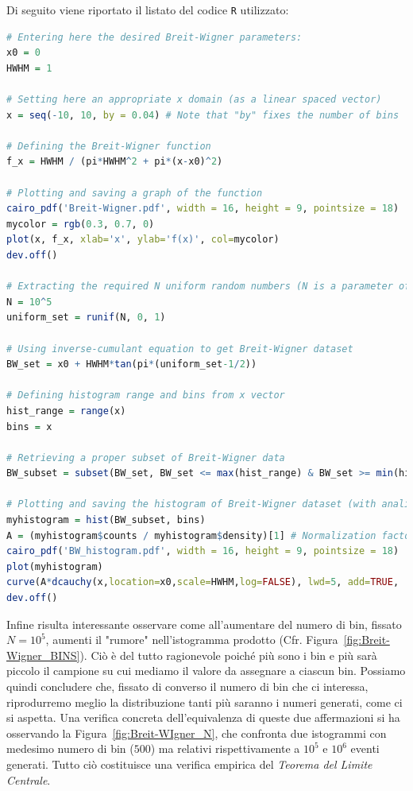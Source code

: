 \noindent Di seguito viene riportato il listato del codice \texttt{R} utilizzato:

\begin{lstlisting}[language=R, style=Rstyle, caption=\texttt{R} code for Exercise 1/A (to generate a Breit-Wigner histogram), xleftmargin=.02\textwidth]
# Entering here the desired Breit-Wigner parameters:
x0 = 0
HWHM = 1

# Setting here an appropriate x domain (as a linear spaced vector)
x = seq(-10, 10, by = 0.04) # Note that "by" fixes the number of bins

# Defining the Breit-Wigner function
f_x = HWHM / (pi*HWHM^2 + pi*(x-x0)^2)

# Plotting and saving a graph of the function
cairo_pdf('Breit-Wigner.pdf', width = 16, height = 9, pointsize = 18)
mycolor = rgb(0.3, 0.7, 0)
plot(x, f_x, xlab='x', ylab='f(x)', col=mycolor)
dev.off()

# Extracting the required N uniform random numbers (N is a parameter of choice)
N = 10^5
uniform_set = runif(N, 0, 1) 

# Using inverse-cumulant equation to get Breit-Wigner dataset
BW_set = x0 + HWHM*tan(pi*(uniform_set-1/2))
	
# Defining histogram range and bins from x vector
hist_range = range(x)
bins = x

# Retrieving a proper subset of Breit-Wigner data 
BW_subset = subset(BW_set, BW_set <= max(hist_range) & BW_set >= min(hist_range))

# Plotting and saving the histogram of Breit-Wigner dataset (with analitical check)
myhistogram = hist(BW_subset, bins)
A = (myhistogram$counts / myhistogram$density)[1] # Normalization factor
cairo_pdf('BW_histogram.pdf', width = 16, height = 9, pointsize = 18)
plot(myhistogram)
curve(A*dcauchy(x,location=x0,scale=HWHM,log=FALSE), lwd=5, add=TRUE,  col=mycolor)
dev.off()
\end{lstlisting}

\noindent Infine risulta interessante osservare come all'aumentare del numero di bin, fissato $N=10^5$, aumenti il "rumore" nell'istogramma prodotto (Cfr. Figura~\ref{fig:Breit-Wigner_BINS}). Ciò è del tutto ragionevole poiché più sono i bin e più sarà piccolo il campione su cui mediamo il valore da assegnare a ciascun bin. Possiamo quindi concludere che, fissato di converso il numero di bin che ci interessa, riprodurremo meglio la distribuzione tanti più saranno i numeri generati, come ci si aspetta. Una verifica concreta dell'equivalenza di queste due affermazioni si ha osservando la Figura~\ref{fig:Breit-WIgner_N}, che confronta due istogrammi con medesimo numero di bin ($500$) ma relativi rispettivamente a $10^5$ e $10^6$ eventi generati. Tutto ciò costituisce una verifica empirica del \textsl{Teorema del Limite Centrale}.

